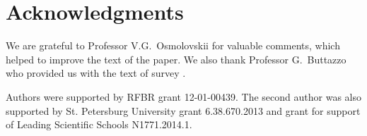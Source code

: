 \section*{Acknowledgments}

We are grateful to Professor V.G.~Osmolovskii for valuable comments,
which helped to improve the text of the paper.
We also thank Professor G.~Buttazzo who provided us with the text of survey \cite{BB}.

Authors were supported by RFBR grant 12-01-00439.
The second author was also supported by St. Petersburg University grant 6.38.670.2013 and
grant for support of Leading Scientific Schools N1771.2014.1.